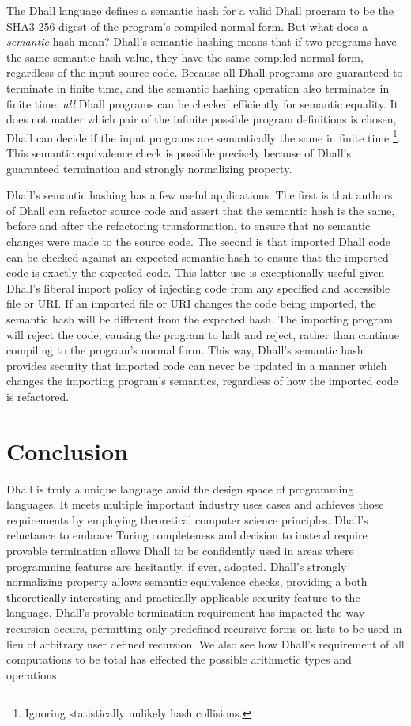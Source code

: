 \documentclass[12pt]{diazessay}
\begin{document}
The Dhall language defines a semantic hash for a valid Dhall program to be the SHA3-256 \cite{dworkin2015sha, bertoni2013keccak} digest of the program's compiled normal form.
But what does a \emph{semantic} hash mean?
Dhall's semantic hashing means that if two programs have the same semantic hash value, they have the same compiled normal form, regardless of the input source code.
Because all Dhall programs are guaranteed to terminate in finite time, and the semantic hashing operation also terminates in finite time, \emph{all} Dhall programs can be checked efficiently for semantic equality.
It does not matter which pair of the infinite possible program definitions is chosen, Dhall can decide if the input programs are semantically the same in finite time \footnote{Ignoring statistically unlikely hash collisions.}.
This semantic equivalence check is possible precisely because of Dhall's guaranteed termination and strongly normalizing property.

Dhall's semantic hashing has a few useful applications.
The first is that authors of Dhall can refactor source code and assert that the semantic hash is the same, before and after the refactoring transformation, to ensure that no semantic changes were made to the source code.
The second is that imported Dhall code can be checked against an expected semantic hash to ensure that the imported code is exactly the expected code.
This latter use is exceptionally useful given Dhall's liberal import policy of injecting code from any specified and accessible file or URI.
If an imported file or URI changes the code being imported, the semantic hash will be different from the expected hash. The importing program will reject the code, causing the program to halt and reject, rather than continue compiling to the program's normal form.
This way, Dhall's semantic hash provides security that imported code can never be updated in a manner which changes the importing program's semantics, regardless of how the imported code is refactored.

\section*{Conclusion}

Dhall is truly a unique language amid the design space of programming languages.
It meets multiple important industry uses cases and achieves those requirements by employing theoretical computer science principles.
Dhall's reluctance to embrace Turing completeness and decision to instead require provable termination allows Dhall to be confidently used in areas where programming features are hesitantly, if ever, adopted.
Dhall's strongly normalizing property allows semantic equivalence checks, providing a both theoretically interesting and practically applicable security feature to the language.
Dhall's provable termination requirement has impacted the way recursion occurs, permitting only predefined recursive forms on lists to be used in lieu of arbitrary user defined recursion.
We also see how Dhall's requirement of all computations to be total has effected the possible arithmetic types and operations.
\end{document}
